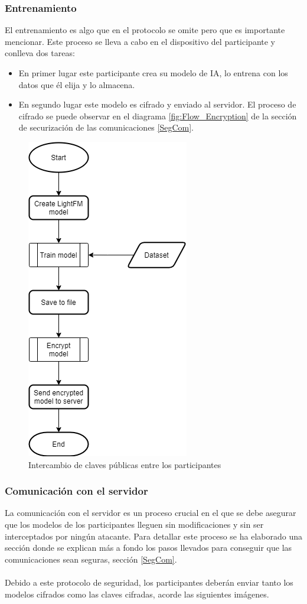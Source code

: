 \subsubsection{Entrenamiento}
El entrenamiento es algo que en el protocolo se omite pero que es importante mencionar. Este proceso se lleva a cabo en el dispositivo del participante y conlleva dos tareas:
\begin{itemize}
    \item En primer lugar este participante crea su modelo de IA, lo entrena con los datos que él elija y lo almacena.
    \item En segundo lugar este modelo es cifrado y enviado al servidor. El proceso de cifrado se puede observar en el diagrama \ref{fig:Flow_Encryption} de la sección de securización de las comunicaciones \ref{SegCom}.
\end{itemize} 
\begin{figure}[H]
    \centering
    \includegraphics[height=0.6\textheight]{Figuras/flowchart_train.png}    
    \caption{Intercambio de claves públicas entre los participantes} 
    \label{fig:Entrenamiento}
\end{figure}

\subsubsection{Comunicación con el servidor}
La comunicación con el servidor es un proceso crucial en el que se debe asegurar que los modelos de los participantes lleguen sin modificaciones y sin ser interceptados por ningún atacante. Para detallar este proceso se ha elaborado una sección donde se explican más a fondo los pasos llevados para conseguir que las comunicaciones sean seguras, sección \ref{SegCom}.
\\ \\
Debido a este protocolo de seguridad, los participantes deberán enviar tanto los modelos cifrados como las claves cifradas, acorde las siguientes imágenes.

